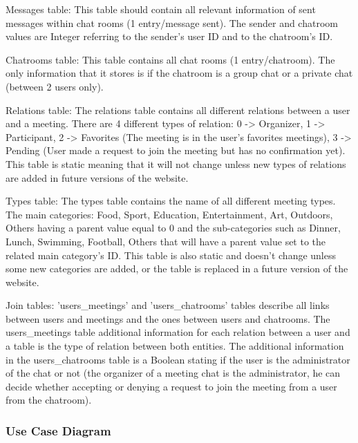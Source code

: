 \documentclass[conference]{IEEEtran}
\begin{document}
Messages table:
This table should contain all relevant information of sent messages within chat rooms (1 entry/message sent). The sender and chatroom values are Integer referring to the sender’s user ID and to the chatroom’s ID.

Chatrooms table:
This table contains all chat rooms (1 entry/chatroom).
The only information that it stores is if the chatroom is a group chat or a private chat (between 2 users only).

Relations table:
The relations table contains all different relations between a user and a meeting. There are 4 different types of relation: 0 -> Organizer, 1 -> Participant, 2 -> Favorites (The meeting is in the user’s favorites meetings), 3 -> Pending (User made a request to join the meeting but has no confirmation yet). This table is static meaning that it will not change unless new types of relations are added in future versions of the website.

Types table:
The types table contains the name of all different meeting types. The main categories: Food, Sport, Education, Entertainment, Art, Outdoors, Others having a parent value equal to 0 and the sub-categories such as Dinner, Lunch, Swimming, Football, Others that will have a parent value set to the related main category’s ID. This table is also static and doesn’t change unless some new categories are added, or the table is replaced in a future version of the website.

Join tables:
'users\_meetings' and 'users\_chatrooms' tables describe all links between users and meetings and the ones between users and chatrooms. The users\_meetings table additional information for each relation between a user and a table is the type of relation between both entities. The additional information in the users\_chatrooms table is a Boolean stating if the user is the administrator of the chat or not (the organizer of a meeting chat is the administrator, he can decide whether accepting or denying a request to join the meeting from a user from the chatroom).

\subsubsection{Use Case Diagram}
\end{document}
